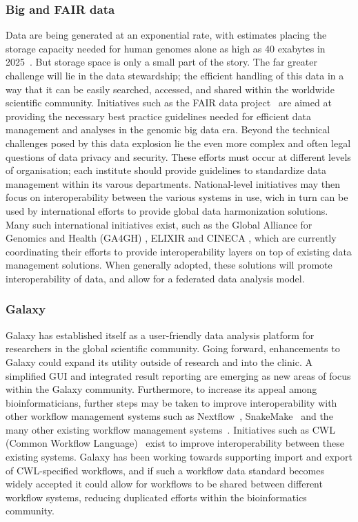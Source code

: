 \subsubsection{Big and FAIR data}
Data are being generated at an exponential rate, with estimates placing the storage capacity needed for human genomes alone as high as 40 exabytes in 2025~\cite{stephens2015}.
But storage space is only a small part of the story. The far greater challenge will lie in the data stewardship; the efficient handling of this data in a way that it can be easily searched, accessed, and shared within the worldwide scientific community.
Initiatives such as the FAIR data project~\cite{wilkinson2016fair} are aimed at providing the necessary best practice guidelines needed for efficient data management and analyses in the genomic big data era. Beyond the technical challenges posed by this data explosion lie the even more complex and often legal questions of data privacy and security.
These efforts must occur at different levels of organisation; each institute should provide guidelines to standardize data management within its varous departments. National-level initiatives may then focus on interoperability between the various systems in use, wich in turn can be used by international efforts to provide global data harmonization solutions.
Many such international initiatives exist, such as the Global Alliance for Genomics and Health (GA4GH) \cite{ga4gh}, ELIXIR \cite{elixir} and CINECA \cite{cineca}, which are currently coordinating their efforts to provide interoperability layers on top of existing data management solutions.
When generally adopted, these solutions will promote interoperability of data, and allow for a federated data analysis model.


\subsubsection{Galaxy}
Galaxy has established itself as a user-friendly data analysis platform for researchers in the global scientific community. Going forward, enhancements to Galaxy could expand its utility outside of research and into the clinic. A simplified GUI and integrated result reporting are emerging as new areas of focus within the Galaxy community.
Furthermore, to increase its appeal among bioinformaticians, further steps may be taken to improve interoperability with other workflow management systems such as Nextflow~\cite{di2017nextflow}, SnakeMake~\cite{koster2012snakemake} and the many other existing workflow management systems~\cite{workflow-engines}.
Initiatives such as CWL (Common Workflow Language)~\cite{amstutz2016common} exist to improve interoperability between these existing systems. Galaxy has been working towards supporting import and export of CWL-specified workflows, and if such a workflow data standard becomes widely accepted it could allow for workflows to be shared between different workflow systems, reducing duplicated efforts within the bioinformatics community.

